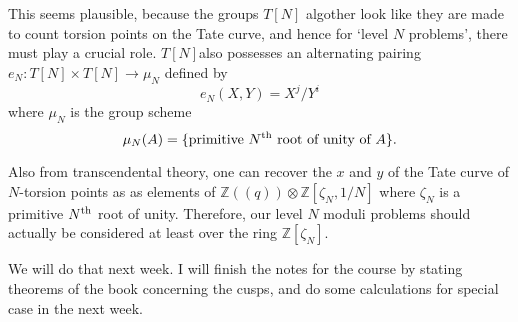\documentclass[a4paper,11pt]{article}
\begin{document}
This seems plausible, because the groups $T[N]$ algother look like they are made to count torsion points on the Tate curve, and hence for `level $N$ problems', there must play a crucial role.
$T[N]$also possesses an alternating pairing $e_N:T[N] \times T[N] \to \mu_N$ defined by
\[
e_N(X,Y)=X^j/Y^i
\]
where $\mu_N$ is the group scheme
\[
\mu_N(A)=\{\textnormal{primitive } N^{\textnormal{th}} \textnormal{ root of unity of } A\}.
\]

Also from transcendental theory, one can recover the $x$ and $y$ of the Tate curve of $N$-torsion points as as elements of $\mathbb{Z}((q)) \otimes \mathbb{Z}[\zeta_N,1/N]$ where $\zeta_N$ is a primitive $N^{\textnormal{th}}$ root of unity.
Therefore, our level $N$ moduli problems should actually be considered at least over the ring $\mathbb{Z}[\zeta_N]$.

We will do that next week.
I will finish the notes for the course by stating theorems of the book concerning the cusps, and do some calculations for special case in the next week.
\end{document}
